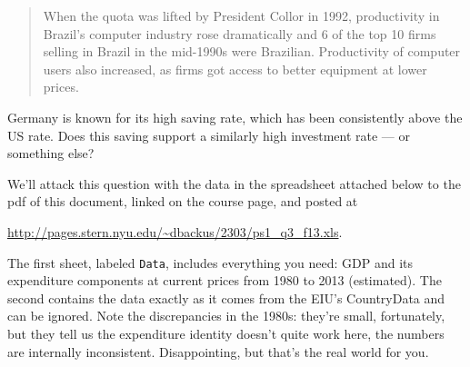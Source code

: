 \documentclass[12pt]{exam}
\newcommand{\NX}{\mbox{\it NX\/}}
\begin{document}
\begin{questions}
\begin{solution}
\begin{parts}
\begin{quote}
When the quota was lifted by President Collor in 1992,
productivity in Brazil's computer industry rose dramatically
and 6 of the top 10 firms selling in Brazil in the mid-1990s were
Brazilian.
Productivity of computer users also increased,
as firms got access to better equipment at lower prices.
\end{quote}
\end{parts}
\end{solution}

Germany is known for its high saving rate, which has been consistently above
the US rate.
Does this saving support a similarly high investment rate --- or something else?

We'll attack this question with the data in the spreadsheet
attached below to the pdf of this document,
linked on the course page, and posted at

\vspace*{\parskip}
\centerline{\url{http://pages.stern.nyu.edu/~dbackus/2303/ps1_q3_f13.xls}.}

The first sheet, labeled {\tt Data}, includes everything you need:
GDP and its expenditure components at current prices from 1980 to 2013 (estimated).
The second contains the data exactly as it comes
from the EIU's CountryData and can be ignored.
Note the discrepancies in the 1980s:
they're small, fortunately, but they tell us the expenditure identity
doesn't quite work here, the numbers are internally inconsistent.
Disappointing, but that's the real world for you.

\end{questions}
\end{document}
